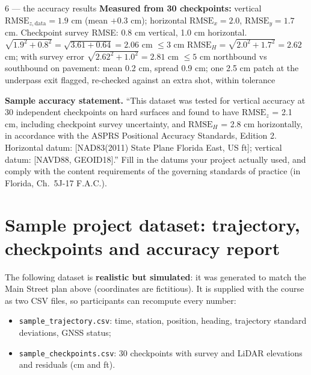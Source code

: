 \begin{worked}{6 --- the accuracy results}
\textbf{Measured from 30 checkpoints:} vertical $\text{RMSE}_{z,\text{data}}=1.9$ cm (mean $+0.3$ cm); horizontal $\text{RMSE}_x=2.0$, $\text{RMSE}_y=1.7$ cm. Checkpoint survey RMSE: 0.8 cm vertical, 1.0 cm horizontal.
 $\sqrt{1.9^2+0.8^2}=\sqrt{3.61+0.64}=2.06$ cm $\le3$ cm \checkmark
{} $\text{RMSE}_H=\sqrt{2.0^2+1.7^2}=2.62$ cm; with survey error $\sqrt{2.62^2+1.0^2}=2.81$ cm $\le5$ cm \checkmark
{} northbound vs southbound on pavement: mean 0.2 cm, spread 0.9 cm; one 2.5 cm patch at the underpass exit flagged, re-checked against an extra shot, within tolerance
\end{worked}

\begin{tip}
\textbf{Sample accuracy statement.} ``This dataset was tested for vertical accuracy at 30 independent checkpoints on hard surfaces and found to have $\text{RMSE}_z$ = 2.1 cm, including checkpoint survey uncertainty, and $\text{RMSE}_H$ = 2.8 cm horizontally, in accordance with the ASPRS Positional Accuracy Standards, Edition 2. Horizontal datum: [NAD83(2011) State Plane Florida East, US ft]; vertical datum: [NAVD88, GEOID18].'' Fill in the datums your project actually used, and comply with the content requirements of the governing standards of practice (in Florida, Ch.\ 5J-17 F.A.C.).
\end{tip}


\section{Sample project dataset: trajectory, checkpoints and accuracy report}\label{sec:dataset}
The following dataset is \textbf{realistic but simulated}: it was generated to match the Main Street plan above (coordinates are fictitious). It is supplied with the course as two CSV files, so participants can recompute every number:
\begin{itemize}
\item \texttt{sample\_trajectory.csv}: time, station, position, heading, trajectory standard deviations, GNSS status;
\item \texttt{sample\_checkpoints.csv}: 30 checkpoints with survey and LiDAR elevations and residuals (cm and ft).
\end{itemize}


